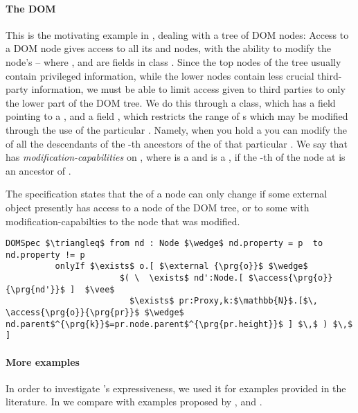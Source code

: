 \paragraph{The DOM}  %
\label{ss:DOM}
This is the motivating example in \cite{dd},
dealing with a tree of DOM nodes: Access to a DOM node
gives access to all its  and  nodes, with the ability to
modify the node's  -- where  ,  and 
are fields in class . Since the top nodes of the tree
usually contain privileged information, while the lower nodes contain
less crucial third-party information, we must be able to limit 
 access given to third parties to only the lower part of the DOM tree. We do this through a  class, which has a field  pointing to a , and a field , which restricts the range of s which may be modified through the use of the particular . Namely, when you hold a   you can modify the  of all the descendants of the    -th ancestors of the  of that particular .  We say that
 has \emph{modification-capabilities} on , where  is
a   and  is a , if the -th  
of the node at  is an ancestor of .


The specification  states that the  of a node can only change if
some external object presently has 
access to a node of the DOM tree, or to some  with modification-capabilties
to the node that was modified.
\begin{lstlisting}[language = Chainmail, mathescape=true, frame=lines]
DOMSpec $\triangleq$ from nd : Node $\wedge$ nd.property = p  to nd.property != p
          onlyIf $\exists$ o.[ $\external {\prg{o}}$ $\wedge$ 
                       $( \  \exists$ nd':Node.[ $\access{\prg{o}}{\prg{nd'}}$ ]  $\vee$ 
                         $\exists$ pr:Proxy,k:$\mathbb{N}$.[$\, \access{\prg{o}}{\prg{pr}}$ $\wedge$ nd.parent$^{\prg{k}}$=pr.node.parent$^{\prg{pr.height}}$ ] $\,$ ) $\,$ ]
\end{lstlisting}

\paragraph{More examples}
In order to investigate \Nec's expressiveness,  
we used it for
examples provided in the literature. 
In  %
we compare with examples proposed by  , and .
 

